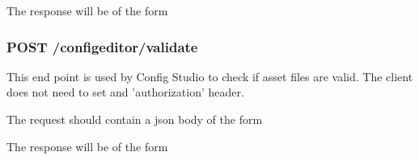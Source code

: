 \begin{Shaded}
\begin{Highlighting}[]
\FunctionTok{\{}
    \FunctionTok{:\{}
        \FunctionTok{:} \FunctionTok{\{}\FunctionTok{:} \FunctionTok{,} \FunctionTok{:} \FunctionTok{,} \FunctionTok{:} \FunctionTok{\}}
    
\StringTok{    \},}
\StringTok{\}}

\end{Highlighting}
\end{Shaded}

The response will be of the form

\begin{Shaded}
\begin{Highlighting}[]
\FunctionTok{\{}
    \FunctionTok{:} \FunctionTok{,}
    \FunctionTok{:} \FunctionTok{,}
    \FunctionTok{:} 
\FunctionTok{\}}
\end{Highlighting}
\end{Shaded}

\hypertarget{post-configeditorvalidate}{%
\subsubsection{POST
/configeditor/validate}\label{post-configeditorvalidate}}

This end point is used by Config Studio to check if asset files are
valid. The client does not need to set and 'authorization' header.

The request should contain a json body of the form

\begin{Shaded}
\begin{Highlighting}[]
\FunctionTok{\{}
    \FunctionTok{:} \FunctionTok{,} 
\FunctionTok{\}}
\end{Highlighting}
\end{Shaded}

The response will be of the form

